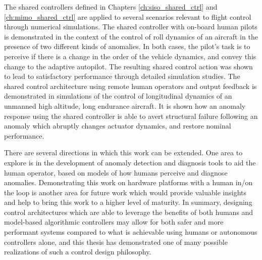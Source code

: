The shared controllers defined in Chapters \ref{ch:siso_shared_ctrl} and \ref{ch:mimo_shared_ctrl} are applied to several scenarios relevant to flight control through numerical simulations. The shared controller with on-board human pilots is demonstrated in the context of the control of roll dynamics of an aircraft in the presence of two different kinds of anomalies. In both cases, the pilot's task is to perceive if there is a change in the order of the vehicle dynamics, and convey this change to the adaptive autopilot. The resulting shared control action was shown to lead to satisfactory performance through detailed simulation studies. The shared control architecture using remote human operators and output feedback is demonstrated in simulations of the control of longitudinal dynamics of an unmanned high altitude, long endurance aircraft. It is shown how an anomaly response using the shared controller is able to avert structural failure following an anomaly which abruptly changes actuator dynamics, and restore nominal performance.

There are several directions in which this work can be extended. One area to explore is in the development of anomaly detection and diagnosis tools to aid the human operator, based on models of how humans perceive and diagnose anomalies. Demonstrating this work on hardware platforms with a human in/on the loop is another area for future work which would provide valuable insights and help to bring this work to a higher level of maturity. In summary, designing control architectures which are able to leverage the benefits of both humans and model-based algorithmic controllers may allow for both safer and more performant systems compared to what is achievable using humans or autonomous controllers alone, and this thesis has demonstrated one of many possible realizations of such a control design philosophy.
